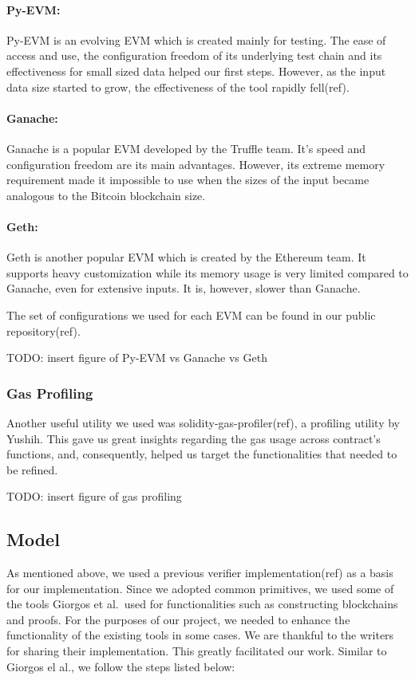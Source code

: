 \paragraph {Py-EVM:} Py-EVM is an evolving EVM which is created mainly for
testing. The ease of access and use, the configuration freedom of its
underlying test chain and its effectiveness for small sized data helped our
first steps. However, as the input data size started to grow, the effectiveness
of the tool rapidly fell(ref).

\paragraph {Ganache:} Ganache is a popular EVM developed by the Truffle team.
It’s speed and configuration freedom are its main advantages. However, its
extreme memory requirement made it impossible to use when the sizes of the
input became analogous to the Bitcoin blockchain size.

\paragraph {Geth:} Geth is another popular EVM which is created by the Ethereum
team. It supports heavy customization while its memory usage is very limited
compared to Ganache, even for extensive inputs. It is, however, slower than
Ganache.

The set of configurations we used for each EVM can be found in our
public repository(ref).

TODO: insert figure of Py-EVM vs Ganache vs Geth

\subsubsection{Gas Profiling}

Another useful utility we used was solidity-gas-profiler(ref), a profiling
utility by Yushih. This gave us great insights regarding the gas usage across
contract’s functions, and, consequently, helped us target the functionalities
that needed to be refined.

TODO: insert figure of gas profiling

\subsection{Model}

As mentioned above, we used a previous verifier implementation(ref) as
a basis for our implementation. Since we adopted common primitives, we
used some of the tools Giorgos et al.\ used for functionalities such as
constructing blockchains and proofs. For the purposes of our project,
we needed to enhance the functionality of the existing tools in some
cases. We are thankful to the writers for sharing their
implementation. This greatly facilitated our work. Similar to Giorgos
el al., we follow the steps listed below:

